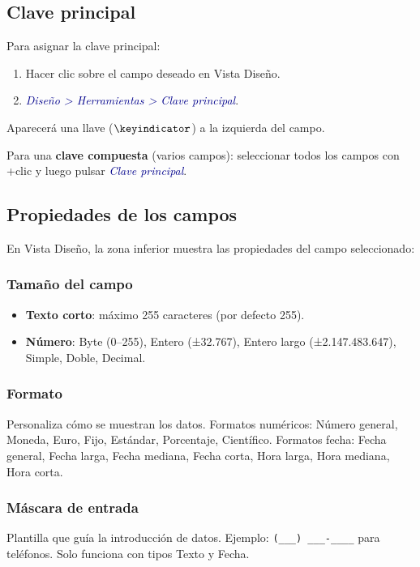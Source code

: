 \documentclass[12pt,a4paper]{article}
\newcommand{\tecla}[1]{\fbox{\small\texttt{#1}}}
\newcommand{\menu}[1]{\textit{\textcolor{darkblue}{#1}}}
\begin{document}
\subsection{Clave principal}

Para asignar la clave principal:
\begin{enumerate}
  \item Hacer clic sobre el campo deseado en Vista Diseño.
  \item \menu{Diseño > Herramientas > Clave principal}.
\end{enumerate}

Aparecerá una llave (\textbf{$\mathbf{\keyindicator}$}) a la izquierda del campo.

\begin{importante}
Para una \textbf{clave compuesta} (varios campos): seleccionar todos los campos con \tecla{Ctrl}+clic y luego pulsar \menu{Clave principal}.
\end{importante}

\subsection{Propiedades de los campos}

En Vista Diseño, la zona inferior muestra las propiedades del campo seleccionado:

\subsubsection{Tamaño del campo}
\begin{itemize}
  \item \textbf{Texto corto}: máximo 255 caracteres (por defecto 255).
  \item \textbf{Número}: Byte (0--255), Entero (±32.767), Entero largo (±2.147.483.647), Simple, Doble, Decimal.
\end{itemize}

\subsubsection{Formato}
Personaliza cómo se muestran los datos. Formatos numéricos: Número general, Moneda, Euro, Fijo, Estándar, Porcentaje, Científico. Formatos fecha: Fecha general, Fecha larga, Fecha mediana, Fecha corta, Hora larga, Hora mediana, Hora corta.

\subsubsection{Máscara de entrada}
Plantilla que guía la introducción de datos. Ejemplo: \texttt{(\_\_\_) \_\_\_-\_\_\_\_} para teléfonos. Solo funciona con tipos Texto y Fecha.
\end{document}
